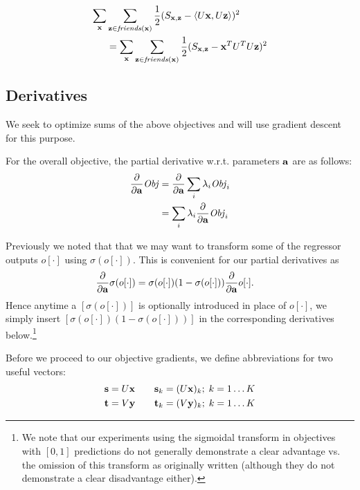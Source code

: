 \begin{align}
\sum_{\mathbf{x}} & \sum_{\mathbf{z} \in \mathit{friends}(\mathbf{x})} \frac{1}{2} (S_{\mathbf{x},\mathbf{z}} - \langle U\mathbf{x}, U\mathbf{z} \rangle)^2 \nonumber \\
& = \sum_{\mathbf{x}} \sum_{\mathbf{z} \in \mathit{friends}(\mathbf{x})} \frac{1}{2} (S_{\mathbf{x},\mathbf{z}} - \mathbf{x}^T U^T U \mathbf{z})^2
\end{align}

\subsection{Derivatives}

We seek to optimize sums of the above objectives and will use
gradient descent for this purpose.  

For the overall objective, the partial derivative 
w.r.t. parameters $\mathbf{a}$ are as follows:
\begin{align*}
\frac{\partial}{\partial \mathbf{a}} \mathit{Obj} & = \frac{\partial}{\partial \mathbf{a}} \sum_i \lambda_i \mathit{Obj}_i\\
& = \sum_i \lambda_i \frac{\partial}{\partial \mathbf{a}} \mathit{Obj}_i \label{eq:sum_der}
\end{align*}

Previously we noted that that we may want to transform
some of the regressor outputs $o[\cdot]$ using $\sigma(o[\cdot])$.  
This is convenient for our partial derivatives as
\begin{align}
 \frac{\partial}{\partial \mathbf{a}}\sigma(o[\cdot]) & = \sigma(o[\cdot]) (1 - \sigma(o[\cdot])) \frac{\partial}{\partial \mathbf{a}} o[\cdot] .
\end{align}
Hence anytime a $[\sigma(o[\cdot])]$ is optionally 
introduced in place of $o[\cdot]$, we simply
insert $[\sigma(o[\cdot]) (1 - \sigma(o[\cdot]))]$ in the corresponding derivatives 
below.\footnote{We note that our experiments using the sigmoidal transform in
objectives with $[0,1]$ predictions do not generally demonstrate a
clear advantage vs. the omission of this transform as originally
written (although they do not demonstrate a clear disadvantage
either).}

Before we proceed to our objective gradients, we define abbreviations
for two useful vectors:
\begin{align*}
\mathbf{s} & = U \mathbf{x} \qquad \mathbf{s}_{k} = (U \mathbf{x})_{k}; \; k=1\ldots K\\
\mathbf{t} & = V \mathbf{y} \qquad \mathbf{t}_{k} = (V \mathbf{y})_{k}; \; k=1\ldots K
\end{align*}

